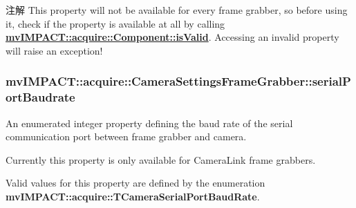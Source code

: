 \begin{DoxyNote}{注解}
This property will not be available for every frame grabber, so before using it, check if the property is available at all by calling {\bfseries \hyperlink{classmv_i_m_p_a_c_t_1_1acquire_1_1_component_ac51e55e7e046101f3c6119d84123abd5}{mv\+I\+M\+P\+A\+C\+T\+::acquire\+::\+Component\+::is\+Valid}}. Accessing an invalid property will raise an exception! 
\end{DoxyNote}
\hypertarget{classmv_i_m_p_a_c_t_1_1acquire_1_1_camera_settings_frame_grabber_afb3db5d1fec3c662154b4f57c03c58c2}{
\subsubsection[{serial\+Port\+Baudrate}]{ mv\+I\+M\+P\+A\+C\+T\+::acquire\+::\+Camera\+Settings\+Frame\+Grabber\+::serial\+Port\+Baudrate}}\label{classmv_i_m_p_a_c_t_1_1acquire_1_1_camera_settings_frame_grabber_afb3db5d1fec3c662154b4f57c03c58c2}


An enumerated integer property defining the baud rate of the serial communication port between frame grabber and camera. 

Currently this property is only available for Camera\+Link\textregistered{} frame grabbers.

Valid values for this property are defined by the enumeration {\bfseries mv\+I\+M\+P\+A\+C\+T\+::acquire\+::\+T\+Camera\+Serial\+Port\+Baud\+Rate}.

